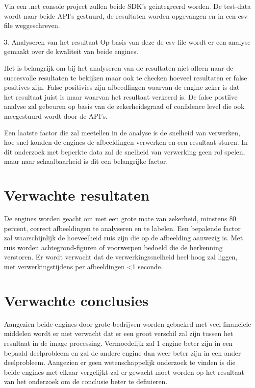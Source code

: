 Via een .net console project zullen beide SDK's geintegreerd worden. De test-data wordt naar beide API's gestuurd, de resultaten worden opgevangen en in een csv file weggeschreven.

3. Analyseren van het resultaat
\linebreak
Op basis van deze de csv file wordt er een analyse gemaakt over de kwaliteit van beide engines.

Het is belangrijk om bij het analyseren van de resultaten niet alleen naar de succesvolle resultaten te bekijken maar ook te checken hoeveel resultaten er false positives zijn. False positivies zijn afbeedlingen waarvan de engine zeker is dat het resultaat juist is maar waarvan het resultaat verkeerd is.
De false postiive analyse zal gebeuren op basis van de zekerheidsgraad of confidence level die ook meegestuurd wordt door de API's.

Een laatste factor die zal meetellen in de analyse is de snelheid van verwerken, hoe snel konden de engines de afbeeldingen verwerken en een resultaat sturen. In dit onderzoek met beperkte data zal de snelheid van verwerking geen rol spelen, maar naar schaalbaarheid is dit een belangrijke factor.

\section{Verwachte resultaten}
\label{sec:verwachte_resultaten}
De engines worden geacht om met een grote mate van zekerheid, minstens 80 percent, correct afbeeldingen te analyseren en te labelen. Een bepalende factor zal waarschijnlijk de hoeveelheid ruis zijn die op de afbeelding aanwezig is. Met ruis worden achtegrond-figuren of voorwerpen bedoeld die de herkenning verstoren.
Er wordt verwacht dat de verwerkingssnelheid heel hoog zal liggen, met verwerkingstijdens per afbeeldingen <1 seconde.

\section{Verwachte conclusies}
\label{sec:verwachte_conclusies}
Aangezien beide engines door grote bedrijven worden gebacked met veel financiele middelen wordt er niet verwacht dat er een groot verschil zal zijn tussen het resultaat in de image processing. Vermoedelijk zal 1 engine beter zijn in een bepaald deelprobleem en zal de andere engine dan weer beter zijn in een ander deelprobleem.
Aangezien er geen wetenschappelijk onderzoek te vinden is die beide engines met elkaar vergelijkt zal er gewacht moet worden op het resultaat van het onderzoek om de conclusie beter te definieren.


